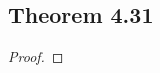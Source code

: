 \documentclass[../../main.tex]{subfiles}
\begin{document}
\subsection{Theorem 4.31}
\begin{wts}

\end{wts}
\begin{proof}

\end{proof}
\end{document}
